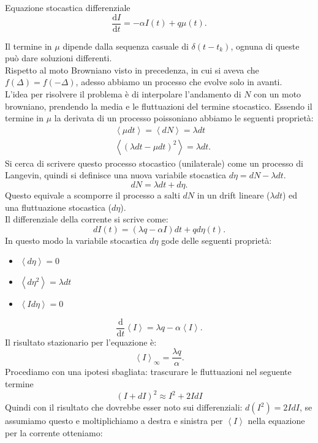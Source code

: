 \begin{redbox}{Equazione stocastica differenziale}
 \[
    \frac{\text{d} I}{\text{d} t} = -\alpha I(t) + q\mu (t) 
.\]    
\end{redbox}
\noindent
Il termine in $\mu$ dipende dalla sequenza casuale di $\delta(t-t_k)$, ognuna di queste può dare soluzioni differenti.\\ 
Rispetto al moto Browniano visto in precedenza, in cui si aveva che $f(\Delta) = f(-\Delta)$, adesso abbiamo un processo che evolve solo in avanti.\\
L'idea per risolvere il problema è di interpolare l'andamento di $N$ con un moto browniano, prendendo la media e le fluttuazioni del termine stocastico.
Essendo il termine in $\mu$ la derivata di un processo poissoniano abbiamo le seguenti proprietà:
\[\begin{aligned}
    &\left<\mu dt\right>=\left<dN\right> = \lambda dt\\
    & \left<\left(\lambda dt - \mu dt\right)^2\right> = \lambda dt
.\end{aligned}\]
Si cerca di scrivere questo processo stocastico (unilaterale) come un processo di Langevin, quindi si definisce una nuova variabile stocastica $d\eta = dN - \lambda dt$.
\[
    dN = \lambda dt + d\eta	
.\] 
Questo equivale a scomporre il processo a salti $dN$ in un drift lineare ($\lambda dt$) ed una fluttuazione stocastica ($d\eta$).\\
Il differenziale della corrente si scrive come:
\[
    dI(t) = \left(\lambda q-\alpha I\right)dt+ qd\eta (t) 
.\] 
In questo modo la variabile stocastica $d\eta$ gode delle seguenti proprietà:
\begin{itemize}
    \item $\left<d\eta \right> = 0$
    \item $\left<d\eta^2 \right> = \lambda dt$
    \item $\left<I d\eta \right> = 0$
\end{itemize}
\[
    \frac{\text{d} }{\text{d} t} \left<I\right> = \lambda q -\alpha\left<I\right>
.\] 
Il risultato stazionario per l'equazione è:
\[
    \left<I\right>_{\infty}=\frac{\lambda q}{\alpha}
.\] 
Procediamo con una ipotesi sbagliata: trascurare le fluttuazioni nel seguente termine
\begin{equation}
    \left(I+dI\right)^2 \approx I^2 + 2IdI	\label{eq:baddiff}
\end{equation}
Quindi con il risultato che dovrebbe esser noto sui differenziali: $d\left(I^2\right) = 2IdI$, se assumiamo questo e moltiplichiamo a destra e sinistra per $\left<I\right>$ nella equazione   per la corrente otteniamo:
